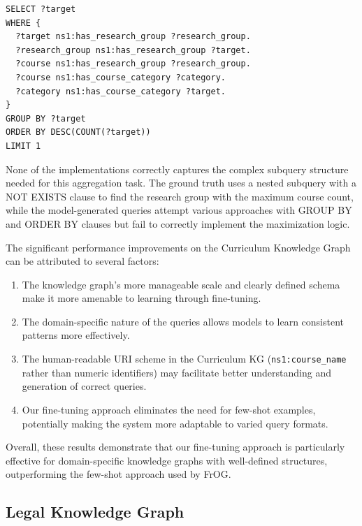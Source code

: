 \begin{lstlisting}[language=SPARQL, caption=Our Random-Walk Fine-tuned Model Output for Research Lab with Most Courses, label=code:curriculum-lab-random]
SELECT ?target
WHERE {
  ?target ns1:has_research_group ?research_group.
  ?research_group ns1:has_research_group ?target.
  ?course ns1:has_research_group ?research_group.
  ?course ns1:has_course_category ?category.
  ?category ns1:has_course_category ?target.
}
GROUP BY ?target
ORDER BY DESC(COUNT(?target))
LIMIT 1
\end{lstlisting}

None of the implementations correctly captures the complex subquery structure needed for this aggregation task. The ground truth uses a nested subquery with a NOT EXISTS clause to find the research group with the maximum course count, while the model-generated queries attempt various approaches with GROUP BY and ORDER BY clauses but fail to correctly implement the maximization logic.

The significant performance improvements on the Curriculum Knowledge Graph can be attributed to several factors:

\begin{enumerate}
    \item The knowledge graph's more manageable scale and clearly defined schema make it more amenable to learning through fine-tuning.
    \item The domain-specific nature of the queries allows models to learn consistent patterns more effectively.
    \item The human-readable URI scheme in the Curriculum KG (\texttt{ns1:course\_name} rather than numeric identifiers) may facilitate better understanding and generation of correct queries.
    \item Our fine-tuning approach eliminates the need for few-shot examples, potentially making the system more adaptable to varied query formats.
\end{enumerate}

Overall, these results demonstrate that our fine-tuning approach is particularly effective for domain-specific knowledge graphs with well-defined structures, outperforming the few-shot approach used by FrOG.

\subsection{Legal Knowledge Graph}
\label{legal-results}

